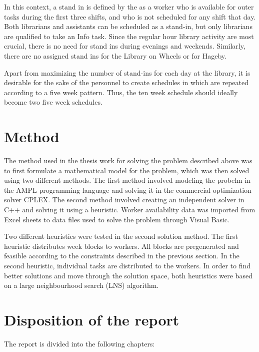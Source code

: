 In this context, a stand in is defined by the as a worker who is available for outer tasks during the first three shifts, and who is not scheduled for any shift that day. Both librarians and assistants can be scheduled as a stand-in, but only librarians are qualified to take an Info task. Since the regular hour library activity are most crucial, there is no need for stand ins during evenings and weekends. Similarly, there are no assigned stand ins for the Library on Wheels or for Hageby.

Apart from maximizing the number of stand-ins for each day at the library, it is desirable for the sake of the personnel to create schedules in which are repeated according to a five week pattern. Thus, the ten week schedule should ideally become two five week schedules. 

\section{Method}
The method used in the thesis work for solving the problem described above was to first formulate a mathematical model for the problem, which was then solved using two different methods. The first method involved modeling the probelm in the AMPL programming language and solving it in the commercial optimization solver CPLEX. The second method involved creating an independent solver in C++ and solving it using a heuristic. Worker availability data was imported from Excel sheets to data files used to solve the problem through Visual Basic.

Two different heuristics were tested in the second solution method. The first heuristic distributes week blocks to workers. All blocks are pregenerated and feasible according to the constraints described in the previous section. In the second heuristic, individual tasks are distributed to the workers. In order to find better solutions and move through the solution space, both heuristics were based on a large neighbourhood search (LNS) algorithm.

\section{Disposition of the report}

The report is divided into the following chapters:

